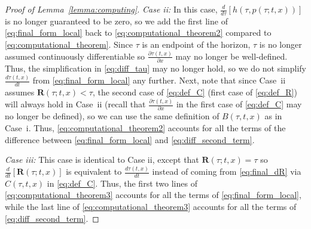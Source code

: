 \documentclass[10pt,conference]{ieeeconf}
\renewcommand{\(}{\left(}
\renewcommand{\)}{\right)}
\renewcommand{\[}{\left[}
\renewcommand{\]}{\right]}
\begin{document}
\begin{proof}[Proof of Lemma~\ref{lemma:computing}]
\emph{Case ii:} In this case, $\frac{d}{d\tau}[h(\tau,p(\tau;t,x))]$ is no longer guaranteed to be zero, so we add the first line of \eqref{eq:final_form_local} back to \eqref{eq:computational_theorem2} compared to \eqref{eq:computational_theorem}. Since $\tau$ is an endpoint of the horizon, $\tau$ is no longer assumed continuously differentiable so $\frac{\partial \tau(t,x)}{\partial x}$ may no longer be well-defined. Thus, the simplification in \eqref{eq:diff_tau} may no longer hold, so we do not simplify $\frac{d\tau(t,x)}{dt}$ from \eqref{eq:final_form_local} any further. Next, note that since Case~ii assumes $\boldsymbol{R}(\tau;t,x) < \tau$, the second case of \eqref{eq:def_C} (first case of \eqref{eq:def_R}) will always hold in Case~ii (recall {that $\frac{\partial \tau(t,x)}{\partial x}$ in} the first case of \eqref{eq:def_C} may no longer be defined), so we can use the same definition of $B(\tau,t,x)$ as in Case~i. %
Thus, \eqref{eq:computational_theorem2} accounts for all the terms of the difference between \eqref{eq:final_form_local} and \eqref{eq:diff_second_term}.

\emph{Case iii:} This case is identical to Case ii, except that $\boldsymbol{R}(\tau;t,x) = \tau$ so $\frac{d}{dt}[\boldsymbol{R}(\tau;t,x)]$ is equivalent to $\frac{d\tau(t,x)}{dt}$ instead of coming from \eqref{eq:final_dR} via $C(\tau,t,x)$ in \eqref{eq:def_C}. Thus, the first two lines of \eqref{eq:computational_theorem3} accounts for all the terms of \eqref{eq:final_form_local}, while the last line of \eqref{eq:computational_theorem3} accounts for all the terms of \eqref{eq:diff_second_term}.
\end{proof}
\end{document}
